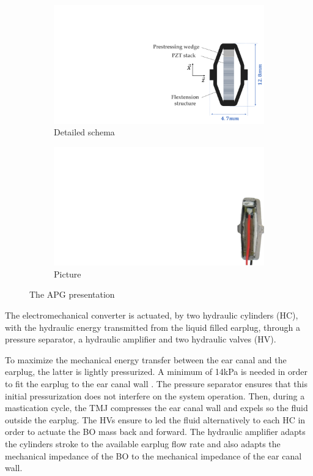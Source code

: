 \documentclass[3p,twocolumn,preprint]{elsarticle}
\def \hfillx {\hspace*{ -\linewidth} \hfill} %
\begin{document}
\begin{figure}[!htb]
	\begin{center}
		\begin{subfigure}[t]{0.6\linewidth}
			\captionsetup{justification=centering}
			\includegraphics[trim={16cm 0cm 0cm 6cm},clip,width=\linewidth]{figures/APG_schema.pdf}
			\caption{Detailed schema}
			\label{fig:APG_schema}
		\end{subfigure}
		\hfillx
		\begin{subfigure}[t]{0.29\linewidth}
			\captionsetup{justification=centering}
			\includegraphics[trim={29.5cm 0cm 0cm 8cm},clip,width=0.65\linewidth]{figures/APG_photo.pdf}
			\caption{Picture}
			\label{fig:APG_photo}
		\end{subfigure}
		\caption{The APG presentation}
		\label{fig:APG}
	\end{center}
\end{figure}

The electromechanical converter is actuated, by two hydraulic cylinders (HC), with the hydraulic energy transmitted from the liquid filled earplug, through a pressure separator, a hydraulic amplifier and two hydraulic valves (HV).

To maximize the mechanical energy transfer between the ear canal and the earplug, the latter is lightly pressurized. A minimum of 14kPa is needed in order to fit the earplug to the ear canal wall \cite{Delnavaz2013}. The pressure separator ensures that this initial pressurization does not interfere on the system operation. Then, during a mastication cycle, the TMJ compresses the ear canal wall and expels so the fluid outside the earplug. The HVs ensure to led the fluid alternatively to each HC in order to actuate the BO mass back and forward. The hydraulic amplifier adapts the cylinders stroke to the available earplug flow rate and also adapts the mechanical impedance of the BO to the mechanical impedance of the ear canal wall.
\end{document}
